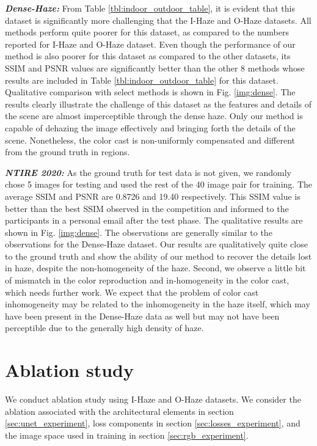 \documentclass[runningheads]{llncs}
\begin{document}
\textbf{\textit{Dense-Haze:}} From Table \ref{tbl:indoor_outdoor_table}, it is evident that this dataset is significantly more challenging that the I-Haze and O-Haze datasets. All methods perform quite poorer for this dataset, as compared to the numbers reported for I-Haze and O-Haze dataset. Even though the performance of our method is also poorer for this dataset as compared to the other datasets, its SSIM and PSNR values are significantly better than the other 8 methods whose results are included in Table \ref{tbl:indoor_outdoor_table} for this dataset. Qualitative comparison with select methods is shown in Fig. \ref{img:dense}. The results clearly illustrate the challenge of this dataset as the features and details of the scene are almost imperceptible through the dense haze. Only our method is capable of dehazing the image effectively and bringing forth the details of the scene. Nonetheless, the color cast is non-uniformly compensated and different from the ground truth in regions.  

\textbf{\textit{NTIRE 2020:}} As the ground truth for test data is not given, we randomly chose 5 images for testing and used the rest of the 40 image pair for training. The average SSIM and PSNR are 0.8726 and 19.40  respectively. This SSIM value is better than the best SSIM observed in the competition and informed to the participants in a personal email after the test phase. The qualitative results are shown in Fig. \ref{img:dense}. The observations are generally similar to the observations for the Dense-Haze dataset. Our results are qualitatively quite close to the ground truth and show the ability of our method to recover the details lost in haze, despite the non-homogeneity of the haze. Second, we observe a little bit of mismatch in the color reproduction and in-homogeneity in the color cast, which needs further work. We expect that the problem of color cast inhomogeneity may be related to the inhomogeneity in the haze itself, which may have been present in the Dense-Haze data as well but may not have been perceptible due to the generally high density of haze. 

\section{Ablation study}\label{sec:ablation}

We conduct ablation study using I-Haze and O-Haze datasets. We consider the ablation associated with the architectural elements in section \ref{sec:unet_experiment}, loss components in section \ref{sec:losses_experiment}, and the image space used in training in section \ref{sec:rgb_experiment}. 
\end{document}

